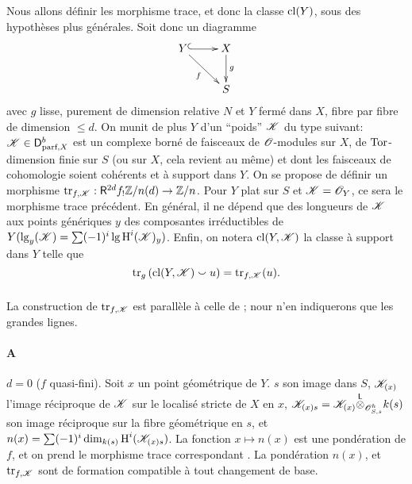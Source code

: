 \subsubsection{}\label{IV:2-3-3}

Nous allons définir les morphisme trace, et donc la classe $\operatorname{cl}(Y)$, sous des 
hypothèses plus générales. Soit donc un diagramme 
\[\xymatrix{
  Y \ar@{^{(}->}[r] \ar[dr]_-f 
    & X \ar[d]^-g \\
  & S
}\]
avec $g$ lisse, purement de dimension relative $N$ et $Y$ fermé dans $X$, 
fibre par fibre de dimension $\leqslant d$. On munit de plus $Y$ d'un 
``poids'' $\mathscr{K}$ du type suivant: $\mathscr{K}\in\mathsf{D}_{\text{parf},X}^b$ est un 
complexe borné de faisceaux de $\mathscr{O}$-modules sur $X$, de $\operatorname{Tor}$-dimension 
finie sur $S$ (ou sur $X$, cela revient au même) et dont les faisceaux de 
cohomologie soient cohérents et à support dans $Y$. On se propose de 
définir un morphisme $\operatorname{tr}_{f,\mathscr{K}}:\mathsf{R}^{2 d}f_! \mathbb{Z}/n(d) \to \mathbb{Z}/n$. Pour $Y$ 
plat sur $S$ et $\mathscr{K}=\mathscr{O}_Y$, ce sera le morphisme trace précédent. En 
général, il ne dépend que des longueurs de $\mathscr{K}$ aux points 
génériques $y$ des composantes irréductibles de 
$Y(\operatorname{lg}_y(\mathscr{K}) = \sum (-1)^i \operatorname{lg} \operatorname{H}^i(\mathscr{K})_y)$. 
Enfin, on notera $\operatorname{cl}(Y,\mathscr{K})$ la classe à support dans $Y$ telle que 
\begin{equation}\label{IV:eq:2-3-3-1}
  \operatorname{tr}_g\left(\operatorname{cl}(Y,\mathscr{K})\smallsmile u\right) = \operatorname{tr}_{f,\mathscr{K}}(u) \text{.}
\end{equation}





\subsubsection{}\label{IV:2-3-4}

La construction de $\operatorname{tr}_{f,\mathscr{K}}$ est parallèle à celle de 
\cite[XVIII.2]{sga4}; nour n'en indiquerons que les grandes lignes.

\paragraph{A}
$d=0$ ($f$ quasi-fini). Soit $x$ un point géométrique de $Y$. $s$ son image 
dans $S$, $\mathscr{K}_{(x)}$ l'image réciproque de $\mathscr{K}$ sur le localisé stricte 
de $X$ en $x$, $\mathscr{K}_{(x)s} = \mathscr{K}_{(x)}{\overset{\mathsf{L}}{\otimes}}_{\mathscr{O}_{S,s}^h} k(s)$ son image 
réciproque sur la fibre géométrique en $s$, et 
$n(x)=\sum (-1)^i \dim_{k(s)} \operatorname{H}^i(\mathscr{K}_{(x)s})$. La fonction $x\mapsto n(x)$ 
est une pondération de $f$, et on prend le morphisme trace correspondant 
\cite[XVII.6.2.5]{sga4}. La pondération $n(x)$, et $\operatorname{tr}_{f,\mathscr{K}}$ sont de 
formation compatible à tout changement de base. 

